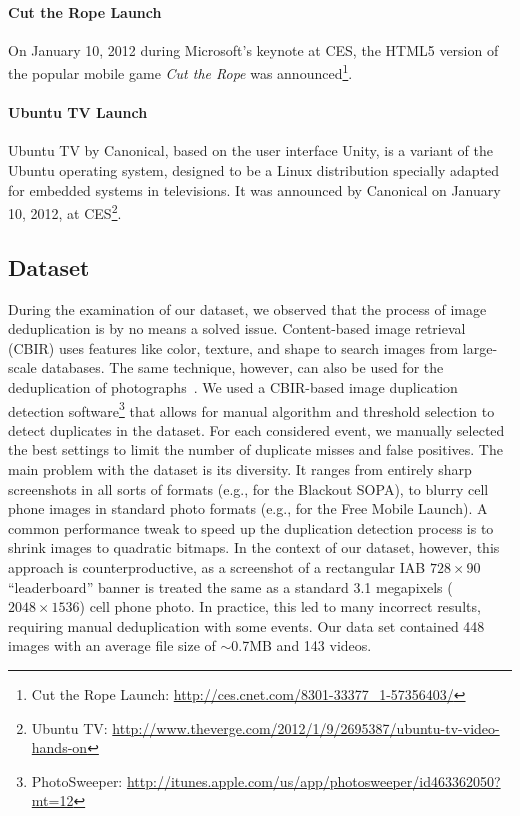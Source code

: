 \documentclass{acm_proc_article-sp}
\newcommand{\inlinelistingsize}{\fontsize{8pt}{11pt}}
\let\oldurl\url
\renewcommand{\url}[1]{\inlinelistingsize\oldurl{#1}}
\begin{document}
\paragraph{Cut the Rope Launch}
On January 10, 2012 during Microsoft's keynote at CES, the HTML5 version of the popular mobile game \textit{Cut the Rope} was announced\footnote{Cut the Rope Launch: \url{http://ces.cnet.com/8301-33377_1-57356403/}}.

\paragraph{Ubuntu TV Launch}
Ubuntu TV by Canonical, based on the user interface Unity, is a variant of the Ubuntu operating system, designed to be a Linux distribution specially adapted for embedded systems in televisions. It was announced by Canonical on January 10, 2012, at CES\footnote{Ubuntu TV: \url{http://www.theverge.com/2012/1/9/2695387/ubuntu-tv-video-hands-on}}.

\subsection{Dataset}
\label{subsec:dataset}
During the examination of our dataset, we observed that the process of image deduplication is by no means a solved issue.
Content-based image retrieval (CBIR) uses features like color, texture, and shape to search images from large-scale databases.
The same technique, however, can also be used for the deduplication of photographs~\cite{Pattabhi2011}.
We used a CBIR-based image duplication detection software\footnote{PhotoSweeper: \url{http://itunes.apple.com/us/app/photosweeper/id463362050?mt=12}} that allows for manual algorithm and threshold selection to detect duplicates in the dataset.
For each considered event, we manually selected the best settings to limit the number of duplicate misses and false positives.
The main problem with the dataset is its diversity.
It ranges from entirely sharp screenshots in all sorts of formats (e.g., for the Blackout SOPA), to blurry cell phone images in standard photo formats (e.g., for the Free Mobile Launch).
A common performance tweak to speed up the duplication detection process is to shrink images to quadratic bitmaps.
In the context of our dataset, however, this approach is counterproductive, as a screenshot of a rectangular IAB $728 \times 90$ ``leaderboard'' banner is treated the same as a standard 3.1 megapixels ($2048 \times 1536$) cell phone photo.
In practice, this led to many incorrect results, requiring manual deduplication with some events.
Our data set contained 448 images with an average file size of $\sim$0.7MB and 143 videos.
\end{document}
